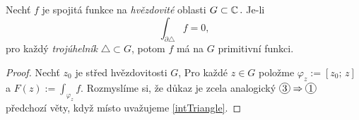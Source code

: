 \begin{amendment}
Nechť $f$ je spojitá funkce na \emph{hvězdovité} oblasti $G\subset\operatorname{\mathbb{C}}  .$ Je-li
\begin{equation}\label{intTriangle}
    \int_{\partial\triangle}f=0\text{,}
\end{equation}
pro každý \emph{trojúhelník} $\triangle\subset G$, potom $f$ má na $G$ primitivní funkci.
\end{amendment}

\begin{proof}
Nechť $z_0$ je střed hvězdovitosti $G$, Pro každé $z\in G$
položme $\varphi_z:=[z_0;\,z]$ a $F(z):=\int_{\varphi_z}f\text{.}$ 
Rozmyslíme si, že důkaz
je zcela analogický $\circled{3}\Rightarrow\circled{1}$ předchozí věty, když místo  uvažujeme \cref{intTriangle}.%
\end{proof}